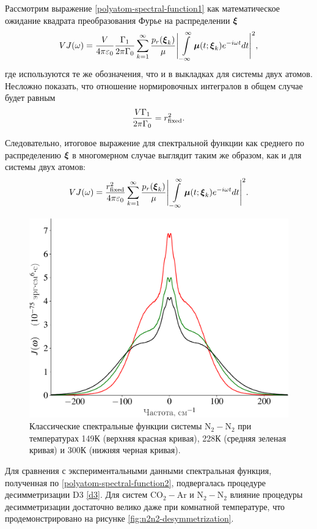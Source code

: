 Рассмотрим выражение \eqref{polyatom-spectral-function1} как математическое ожидание квадрата преобразования Фурье на распределении $\boldsymbol{\xi}$
\begin{gather}
    VJ(\omega) = \frac{V}{4 \pi \varepsilon_0} \frac{\Gamma_1}{2 \pi \Gamma_0} \sum_{k = 1}^\infty \frac{p_r(\boldsymbol{\xi}_k)}{\mu} \Bigg\vert \int\limits_{-\infty}^\infty \boldsymbol{\mu}(t; \boldsymbol{\xi}_k) e^{-i \omega t} dt \Bigg\vert^2,
\end{gather}
%
где используются те же обозначения, что и в выкладках для системы двух атомов. Несложно показать, что отношение нормировочных интегралов в общем случае будет равным
\begin{gather}
    \frac{V \Gamma_1}{2 \pi \Gamma_0} = r_\text{fixed}^2.
\end{gather}

Следовательно, итоговое выражение для спектральной функции как среднего по распределению $\boldsymbol{\xi}$ в многомерном случае выглядит таким же образом, как и для системы двух атомов:
\begin{gather}
    V J(\omega) = \frac{r_\text{fixed}^2}{4 \pi \varepsilon_0} \sum_{k = 1}^\infty \frac{p_r(\boldsymbol{\xi}_k)}{\mu} \Bigg\vert \int\limits_{-\infty}^\infty \boldsymbol{\mu}(t; \boldsymbol{\xi}_k) e^{-i \omega t} dt \Bigg\vert^2. \label{polyatom-spectral-function2}
\end{gather}

\begin{figure}[H]
    \centering
    \includegraphics[width=0.7\linewidth]{./pictures/polyatom_spectra/n2n2_spectral_functions-crop.pdf}
    \caption{Классические спектральные функции системы N$_2-$N$_2$ при температурах 149К (верхняя красная кривая), 228К (средняя зеленая кривая) и 300К (нижняя черная кривая).}
    \label{fig:n2n2-spectral-functions}
\end{figure}

Для сравнения с экспериментальными данными спектральная функция, полученная по \eqref{polyatom-spectral-function2},  подвергалась процедуре десимметризации D3 \eqref{d3}. Для систем CO$_2-$Ar и N$_2-$N$_2$ влияние процедуры десимметризации достаточно велико даже при комнатной температуре, что продемонстрировано на рисунке \ref{fig:n2n2-desymmetrization}. 

